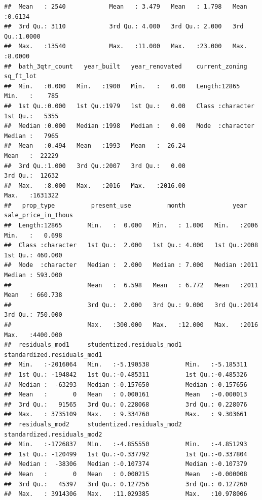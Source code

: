 \documentclass{article}\usepackage[]{graphicx}\usepackage[]{xcolor}
\makeatletter
\newenvironment{kframe}{%
 \def\at@end@of@kframe{}%
 \ifinner\ifhmode%
  \def\at@end@of@kframe{\end{minipage}}%
  \begin{minipage}{\columnwidth}%
 \fi\fi%
 \def\FrameCommand##1{\hskip\@totalleftmargin \hskip-\fboxsep
 \colorbox{shadecolor}{##1}\hskip-\fboxsep
     \hskip-\linewidth \hskip-\@totalleftmargin \hskip\columnwidth}%
 \MakeFramed {\advance\hsize-\width
   \@totalleftmargin\z@ \linewidth\hsize
   \@setminipage}}%
 {\par\unskip\endMakeFramed%
 \at@end@of@kframe}
\newenvironment{knitrout}{}{} %
\makeatother
\begin{document}
\begin{knitrout}
\begin{kframe}
\begin{verbatim}
##  Mean   : 2540            Mean   : 3.479   Mean   : 1.798   Mean   :0.6134  
##  3rd Qu.: 3110            3rd Qu.: 4.000   3rd Qu.: 2.000   3rd Qu.:1.0000  
##  Max.   :13540            Max.   :11.000   Max.   :23.000   Max.   :8.0000  
##  bath_3qtr_count   year_built   year_renovated    current_zoning       sq_ft_lot      
##  Min.   :0.000   Min.   :1900   Min.   :   0.00   Length:12865       Min.   :    785  
##  1st Qu.:0.000   1st Qu.:1979   1st Qu.:   0.00   Class :character   1st Qu.:   5355  
##  Median :0.000   Median :1998   Median :   0.00   Mode  :character   Median :   7965  
##  Mean   :0.494   Mean   :1993   Mean   :  26.24                      Mean   :  22229  
##  3rd Qu.:1.000   3rd Qu.:2007   3rd Qu.:   0.00                      3rd Qu.:  12632  
##  Max.   :8.000   Max.   :2016   Max.   :2016.00                      Max.   :1631322  
##   prop_type          present_use          month             year      sale_price_in_thous
##  Length:12865       Min.   :  0.000   Min.   : 1.000   Min.   :2006   Min.   :   0.698   
##  Class :character   1st Qu.:  2.000   1st Qu.: 4.000   1st Qu.:2008   1st Qu.: 460.000   
##  Mode  :character   Median :  2.000   Median : 7.000   Median :2011   Median : 593.000   
##                     Mean   :  6.598   Mean   : 6.772   Mean   :2011   Mean   : 660.738   
##                     3rd Qu.:  2.000   3rd Qu.: 9.000   3rd Qu.:2014   3rd Qu.: 750.000   
##                     Max.   :300.000   Max.   :12.000   Max.   :2016   Max.   :4400.000   
##  residuals_mod1     studentized.residuals_mod1 standardized.residuals_mod1
##  Min.   :-2016064   Min.   :-5.190538          Min.   :-5.185311          
##  1st Qu.: -194842   1st Qu.:-0.485311          1st Qu.:-0.485326          
##  Median :  -63293   Median :-0.157650          Median :-0.157656          
##  Mean   :       0   Mean   : 0.000161          Mean   :-0.000013          
##  3rd Qu.:   91565   3rd Qu.: 0.228068          3rd Qu.: 0.228076          
##  Max.   : 3735109   Max.   : 9.334760          Max.   : 9.303661          
##  residuals_mod2     studentized.residuals_mod2 standardized.residuals_mod2
##  Min.   :-1726837   Min.   :-4.855550          Min.   :-4.851293          
##  1st Qu.: -120499   1st Qu.:-0.337792          1st Qu.:-0.337804          
##  Median :  -38306   Median :-0.107374          Median :-0.107379          
##  Mean   :       0   Mean   : 0.000215          Mean   :-0.000008          
##  3rd Qu.:   45397   3rd Qu.: 0.127256          3rd Qu.: 0.127260          
##  Max.   : 3914306   Max.   :11.029385          Max.   :10.978006          

\end{verbatim}
\end{kframe}
\end{knitrout}
\end{document}
